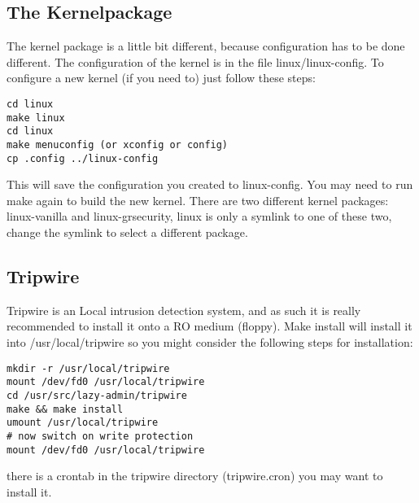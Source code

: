 \documentclass[11pt,a4paper]{article}
\begin{document}
\subsection{The Kernelpackage}
The kernel package is a little bit different, because configuration has to be done different. The configuration of the kernel is in the file linux/linux-config. To configure a new kernel (if you need to) just follow these steps:
\begin{verbatim}
cd linux
make linux
cd linux
make menuconfig (or xconfig or config)
cp .config ../linux-config
\end{verbatim}
This will save the configuration you created to linux-config. You may need to run make again to build the new kernel. There are two different kernel packages: linux-vanilla and linux-grsecurity, linux is only a symlink to one of these two, change the symlink to select a different package.
\subsection{Tripwire}
Tripwire is an Local intrusion detection system, and as such it is really recommended to install it onto a RO medium (floppy). Make install will install it into /usr/local/tripwire so you might consider the following steps for installation: 
\begin{verbatim}
mkdir -r /usr/local/tripwire
mount /dev/fd0 /usr/local/tripwire
cd /usr/src/lazy-admin/tripwire
make && make install
umount /usr/local/tripwire
# now switch on write protection
mount /dev/fd0 /usr/local/tripwire
\end{verbatim}
there is a crontab in the tripwire directory (tripwire.cron) you may want to install it.
\end{document}
